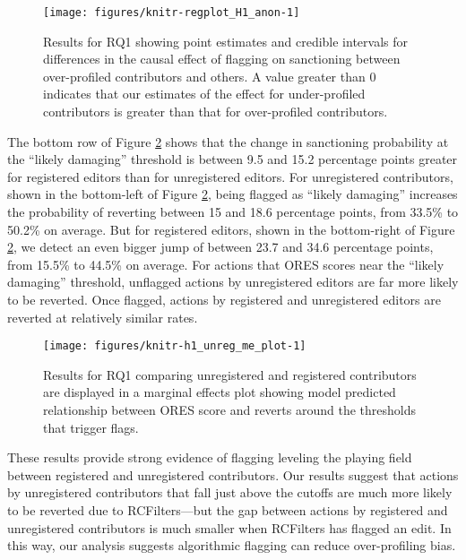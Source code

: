 \documentclass[format=acmsmall, natbib=true,  screen=true]{acmart}
\newenvironment{knitrout}{}{} %
\begin{document}
\begin{figure}
\centering

\begin{knitrout}
\color{fgcolor}
\texttt{[image: figures/knitr-regplot\_H1\_anon-1]} 

\end{knitrout}
\caption{Results for RQ1 showing point estimates and credible intervals for differences in the causal effect of flagging on sanctioning between over-profiled contributors and others.  A value greater than 0 indicates that our estimates of the effect for under-profiled contributors is greater than that for over-profiled contributors.
}
\label{fig:h1.regplot}
\end{figure}                                                          

The bottom row of Figure \ref{fig:h1.me} shows that the change in sanctioning probability at the ``likely damaging'' threshold is
between 9.5 and 15.2 percentage
points greater for registered editors than for unregistered editors. 
For unregistered contributors, shown in the bottom-left of Figure \ref{fig:h1.me}, being flagged as ``likely damaging'' increases the probability of reverting between  15  and 18.6 percentage points, from 33.5\% to 50.2\% on average. 
But for registered editors, shown in the bottom-right of Figure \ref{fig:h1.me}, we detect an even bigger jump of between 23.7  and 34.6 percentage points, from 15.5\% to 44.5\% on average.
For actions that ORES scores near the ``likely damaging'' threshold, unflagged actions by unregistered editors are far more likely to be reverted. Once flagged, actions by registered and unregistered editors are reverted at relatively similar rates.

\begin{figure}[b]
 \centering
\begin{knitrout}
\color{fgcolor}
\texttt{[image: figures/knitr-h1\_unreg\_me\_plot-1]} 

\end{knitrout}
  \caption{Results for RQ1 comparing unregistered and registered contributors are displayed in a marginal effects plot showing model predicted relationship between ORES score and reverts around the thresholds that trigger flags. \label{fig:h1.me}}
\end{figure}


These results provide strong evidence of flagging leveling the playing field between registered and unregistered contributors. Our results suggest that actions by unregistered contributors that fall just above the cutoffs are much more likely to be reverted due to RCFilters---but the gap between actions by registered and unregistered contributors is much smaller when RCFilters has flagged an edit. 
In this way, our analysis suggests algorithmic flagging can reduce over-profiling bias.
\end{document}
